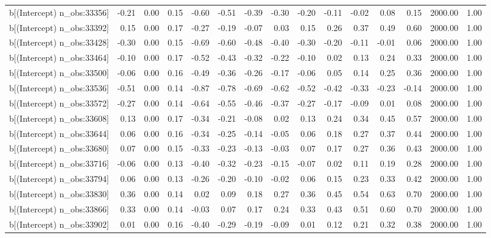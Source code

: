 \begin{table}[ht]
\begin{tabular}{rrrrrrrrrrrrrrr}
  b[(Intercept) n\_obs:33356] & -0.21 & 0.00 & 0.15 & -0.60 & -0.51 & -0.39 & -0.30 & -0.20 & -0.11 & -0.02 & 0.08 & 0.15 & 2000.00 & 1.00 \\ 
  b[(Intercept) n\_obs:33392] & 0.15 & 0.00 & 0.17 & -0.27 & -0.19 & -0.07 & 0.03 & 0.15 & 0.26 & 0.37 & 0.49 & 0.60 & 2000.00 & 1.00 \\ 
  b[(Intercept) n\_obs:33428] & -0.30 & 0.00 & 0.15 & -0.69 & -0.60 & -0.48 & -0.40 & -0.30 & -0.20 & -0.11 & -0.01 & 0.06 & 2000.00 & 1.00 \\ 
  b[(Intercept) n\_obs:33464] & -0.10 & 0.00 & 0.17 & -0.52 & -0.43 & -0.32 & -0.22 & -0.10 & 0.02 & 0.13 & 0.24 & 0.33 & 2000.00 & 1.00 \\ 
  b[(Intercept) n\_obs:33500] & -0.06 & 0.00 & 0.16 & -0.49 & -0.36 & -0.26 & -0.17 & -0.06 & 0.05 & 0.14 & 0.25 & 0.36 & 2000.00 & 1.00 \\ 
  b[(Intercept) n\_obs:33536] & -0.51 & 0.00 & 0.14 & -0.87 & -0.78 & -0.69 & -0.62 & -0.52 & -0.42 & -0.33 & -0.23 & -0.14 & 2000.00 & 1.00 \\ 
  b[(Intercept) n\_obs:33572] & -0.27 & 0.00 & 0.14 & -0.64 & -0.55 & -0.46 & -0.37 & -0.27 & -0.17 & -0.09 & 0.01 & 0.08 & 2000.00 & 1.00 \\ 
  b[(Intercept) n\_obs:33608] & 0.13 & 0.00 & 0.17 & -0.34 & -0.21 & -0.08 & 0.02 & 0.13 & 0.24 & 0.34 & 0.45 & 0.57 & 2000.00 & 1.00 \\ 
  b[(Intercept) n\_obs:33644] & 0.06 & 0.00 & 0.16 & -0.34 & -0.25 & -0.14 & -0.05 & 0.06 & 0.18 & 0.27 & 0.37 & 0.44 & 2000.00 & 1.00 \\ 
  b[(Intercept) n\_obs:33680] & 0.07 & 0.00 & 0.15 & -0.33 & -0.23 & -0.13 & -0.03 & 0.07 & 0.17 & 0.27 & 0.36 & 0.43 & 2000.00 & 1.00 \\ 
  b[(Intercept) n\_obs:33716] & -0.06 & 0.00 & 0.13 & -0.40 & -0.32 & -0.23 & -0.15 & -0.07 & 0.02 & 0.11 & 0.19 & 0.28 & 2000.00 & 1.00 \\ 
  b[(Intercept) n\_obs:33794] & 0.06 & 0.00 & 0.13 & -0.26 & -0.20 & -0.10 & -0.02 & 0.06 & 0.15 & 0.23 & 0.33 & 0.42 & 2000.00 & 1.00 \\ 
  b[(Intercept) n\_obs:33830] & 0.36 & 0.00 & 0.14 & 0.02 & 0.09 & 0.18 & 0.27 & 0.36 & 0.45 & 0.54 & 0.63 & 0.70 & 2000.00 & 1.00 \\ 
  b[(Intercept) n\_obs:33866] & 0.33 & 0.00 & 0.14 & -0.03 & 0.07 & 0.17 & 0.24 & 0.33 & 0.43 & 0.51 & 0.60 & 0.70 & 2000.00 & 1.00 \\ 
  b[(Intercept) n\_obs:33902] & 0.01 & 0.00 & 0.16 & -0.40 & -0.29 & -0.19 & -0.09 & 0.01 & 0.12 & 0.21 & 0.32 & 0.38 & 2000.00 & 1.00 \\ 

\end{tabular}
\end{table}
